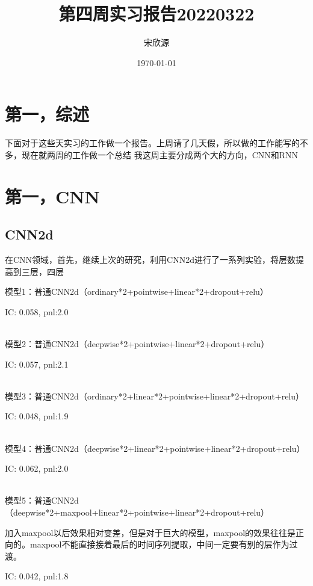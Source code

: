 \documentclass[11pt]{ctexart}
\begin{document}
\title{第四周实习报告20220322}
\author{宋欣源}
\date{\today}

\maketitle %


\section{第一，综述}

下面对于这些天实习的工作做一个报告。上周请了几天假，所以做的工作能写的不多，现在就两周的工作做一个总结
我这周主要分成两个大的方向，CNN和RNN

\section{第一，CNN}
\subsection{CNN2d}
在CNN领域，首先，继续上次的研究，利用CNN2d进行了一系列实验，将层数提高到三层，四层

模型1：普通CNN2d（ordinary*2+pointwise+linear*2+dropout+relu）

{\kaishu \small IC: 0.058, pnl:2.0}

~\\
模型2：普通CNN2d（deepwise*2+pointwise+linear*2+dropout+relu）

{\kaishu \small IC: 0.057, pnl:2.1}

~\\
模型3：普通CNN2d（ordinary*2+linear*2+pointwise+linear*2+dropout+relu）

{\kaishu \small IC: 0.048, pnl:1.9}

~\\
模型4：普通CNN2d（deepwise*2+linear*2+pointwise+linear*2+dropout+relu）

{\kaishu \small IC: 0.062, pnl:2.0}

~\\
模型5：普通CNN2d（deepwise*2+maxpool+linear*2+pointwise+linear*2+dropout+relu）

加入maxpool以后效果相对变差，但是对于巨大的模型，maxpool的效果往往是正向的。maxpool不能直接接着最后的时间序列提取，中间一定要有别的层作为过渡。

{\kaishu \small IC: 0.042, pnl:1.8}
\end{document}
